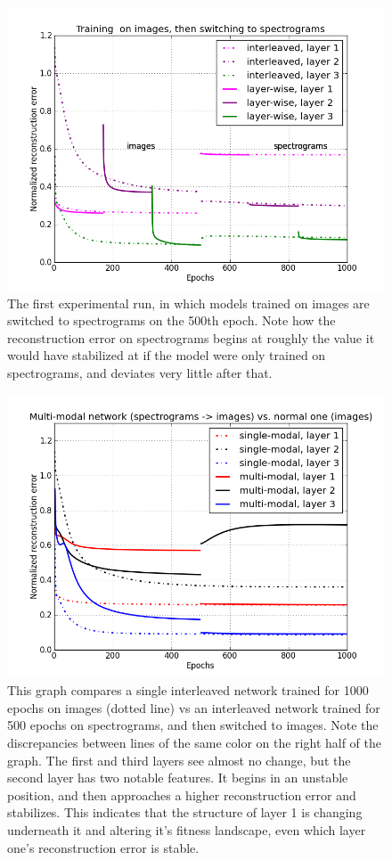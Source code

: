 \documentclass[12pt]{article}
\begin{document}
\begin{doublespacing}
\begin{figure}[p]
\centering
\includegraphics[width=6in]{graph_cross_im_spec}
\caption{The first experimental run, in which models trained on images are switched to spectrograms on the 500th epoch. Note how the reconstruction error on spectrograms begins at roughly the value it would have stabilized at if the model were only trained on spectrograms, and deviates very little after that.}
\label{fig:graph_cross_im_spec}
\end{figure}

\begin{figure}[p]
\centering
\includegraphics[width=6in]{graph_im_multi}
\caption{This graph compares a single interleaved network trained for 1000 epochs on images (dotted line) vs an interleaved network trained for 500 epochs on spectrograms, and then switched to images. Note the discrepancies between lines of the same color on the right half of the graph. The first and third layers see almost no change, but the second layer has two notable features. It begins in an unstable position, and then approaches a higher reconstruction error and stabilizes. This indicates that the structure of layer 1 is changing underneath it and altering it's fitness landscape, even which layer one's reconstruction error is stable.}
\label{fig:graph_im_multi}
\end{figure}


\end{doublespacing}
\end{document}
